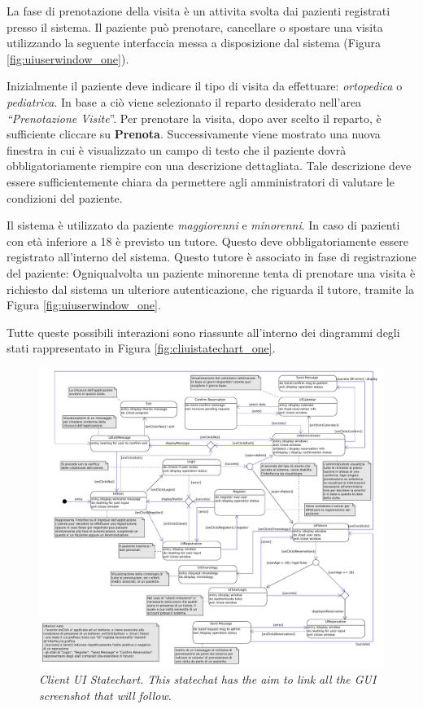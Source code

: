 La fase di prenotazione della visita è un attivita svolta dai pazienti
registrati presso il sistema. Il paziente può prenotare, cancellare
o spostare una visita utilizzando la seguente interfaccia messa a
disposizione dal sistema (Figura \vref{fig:uiuserwindow_one}).

Inizialmente il paziente deve indicare il tipo di visita da effettuare:
\emph{ortopedica} o \emph{pediatrica}. In base a ciò viene selezionato
il reparto desiderato nell'area \emph{{}``Prenotazione Visite}''.
Per prenotare la visita, dopo aver scelto il reparto, è sufficiente
cliccare su \textbf{Prenota}. Successivamente viene mostrato una nuova
finestra in cui è visualizzato un campo di testo che il paziente dovrà
obbligatoriamente riempire con una descrizione dettagliata. Tale descrizione
deve essere sufficientemente chiara da permettere agli amministratori
di valutare le condizioni del paziente. 


Il sistema è utilizzato da paziente \emph{maggiorenni} e \emph{minorenni}.
In caso di pazienti con età inferiore a 18 è previsto un tutore. Questo
deve obbligatoriamente essere registrato all'interno del sistema.
Questo tutore è associato in fase di registrazione del paziente: Ogniqualvolta
un paziente minorenne tenta di prenotare una visita è richiesto
dal sistema un ulteriore autenticazione, che riguarda il tutore, tramite
la Figura \vref{fig:uiuserwindow_one}.

Tutte queste possibili interazioni sono riassunte all'interno dei diagrammi
degli stati rappresentato in Figura \vref{fig:cliuistatechart_one}.

\begin{figure}[p]
\includegraphics[scale=0.47,angle=90]{svgs/UIClient-Statechart-Diagrams}
\caption{\textit{Client UI Statechart. This statechat has the aim to link all the 
GUI screenshot that will follow}.}\label{fig:cliuistatechart_one}
\end{figure}
